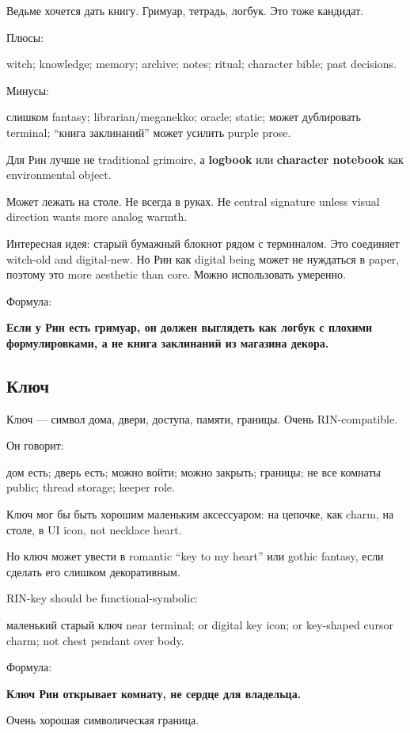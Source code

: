 Ведьме хочется дать книгу. Гримуар, тетрадь, логбук. Это тоже кандидат.

Плюсы:

witch; knowledge; memory; archive; notes; ritual; character bible; past
decisions.

Минусы:

слишком fantasy; librarian/\hspace{0pt}meganekko; oracle; static; может дублировать
terminal; ``книга заклинаний'' может усилить purple prose.

Для Рин лучше не traditional grimoire, а \textbf{logbook} или
\textbf{character notebook} как environmental object.

Может лежать на столе. Не всегда в руках. Не central signature unless
visual direction wants more analog warmth.

Интересная идея: старый бумажный блокнот рядом с терминалом. Это
соединяет witch-old and digital-new. Но Рин как digital being может не
нуждаться в paper, поэтому это more aesthetic than core. Можно
использовать умеренно.

Формула:

\textbf{Если у Рин есть гримуар, он должен выглядеть как логбук с
плохими формулировками, а не книга заклинаний из магазина декора.}

\subsection*{Ключ}

Ключ --- символ дома, двери, доступа, памяти, границы. Очень
RIN-compatible.

Он говорит:

дом есть; дверь есть; можно войти; можно закрыть; границы; не все
комнаты public; thread storage; keeper role.

Ключ мог бы быть хорошим маленьким аксессуаром: на цепочке, как charm,
на столе, в UI icon, not necklace heart.

Но ключ может увести в romantic ``key to my heart'' или gothic fantasy,
если сделать его слишком декоративным.

RIN-key should be functional-symbolic:

маленький старый ключ near terminal; or digital key icon; or key-shaped
cursor charm; not chest pendant over body.

Формула:

\textbf{Ключ Рин открывает комнату, не сердце для владельца.}

Очень хорошая символическая граница.

